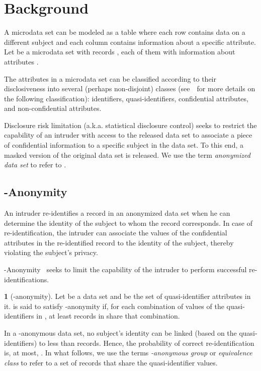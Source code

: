 \documentclass[10pt,journal,compsoc]{IEEEtran}
\theoremstyle{definition}
\newtheorem{defn}{\protect\definitionname}
\theoremstyle{plain}
\providecommand{\definitionname}{Definition}
\begin{document}
\section{Background}
\label{sec:background}

A microdata set can be modeled as a table where each row contains
data on a different subject and each column contains information
about a specific attribute. Let  be a microdata
set with  records , each of them with information
about attributes .

The attributes in a microdata set can be classified according to their
disclosiveness into several (perhaps non-disjoint) classes
(see~\cite{Hundepool2012sdc}~for more details on the following
classification):
identifiers, quasi-identifiers, confidential attributes, and non-confidential attributes.



Disclosure risk limitation (a.k.a. statistical disclosure control) 
seeks to restrict the capability 
of an intruder
with access to the released data set to
associate a piece of confidential
information to a specific subject in the data set.  
To this end, a masked version 
of the original data set  is released. We use
the term \emph{anonymized data set} to refer to . 

\subsection{-Anonymity}

An intruder re-identifies a record in an anonymized data set when
he can determine the identity of the subject
to whom the record corresponds.
In case of re-identification, the intruder can 
associate the values of the confidential attributes
in the re-identified record to the 
identity of the subject, thereby violating the subject's privacy. 


-Anonymity~\cite{Samarati1998Protecting,Sweeney2002kAnonymity}
seeks to limit the capability of the intruder to perform successful
re-identifications. 


\begin{defn}[-anonymity]
	Let  be a data set and  be the 
set of quasi-identifier attributes in it. 
 is said to satisfy -anonymity if, for
each combination of values of the quasi-identifiers in , at least
 records in  share that combination.
\end{defn}
In a -anonymous data set, no subject's identity 
can be linked (based on the quasi-identifiers) 
to less than  records. Hence, the probability of correct
re-identification is, at most, .
In what follows, 
we use the terms \emph{-anonymous
       group} or \emph{equivalence class} to refer to a set of records that
share the quasi-identifier values.
\end{document}
